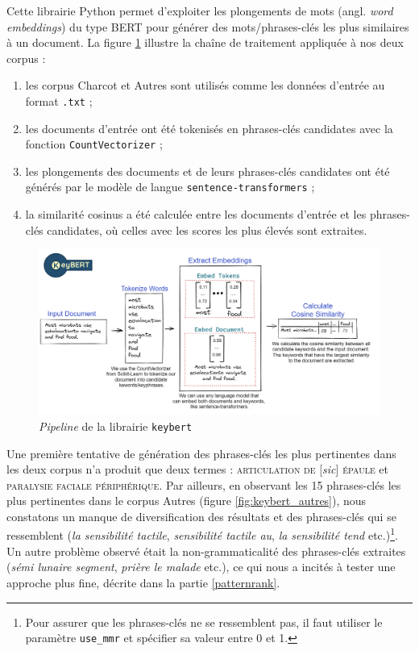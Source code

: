 Cette librairie Python permet d'exploiter les plongements de mots (angl. \textit{word embeddings}) du type \textsc{BERT} pour générer des mots/phrases-clés les plus similaires à un document.
La figure \ref{fig:keybert} illustre la chaîne de traitement appliquée à nos deux corpus : 
\begin{enumerate}
\item les corpus \og Charcot \fg{} et \og Autres \fg{} sont utilisés comme les données d'entrée au format \texttt{.txt} ;
\item les documents d'entrée ont été tokenisés en phrases-clés candidates avec la fonction \texttt{CountVectorizer} ; 
\item les plongements des documents et de leurs phrases-clés candidates ont été générés par le modèle de langue \texttt{sentence-transformers} ;
\item la similarité cosinus a été calculée entre les documents d'entrée et les phrases-clés candidates, où celles avec les scores les plus élevés sont extraites.
\end{enumerate}

\begin{figure}[!h]
    \centering
    \includegraphics[width=1\textwidth]{img/keybert.png}
    \caption[Caption for LOF]{\textit{Pipeline} de la librairie \texttt{keybert}\protect{}}
    \label{fig:keybert}
\end{figure}


Une première tentative de génération des phrases-clés les plus pertinentes dans les deux corpus n'a produit que deux termes : \textsc{articulation de} [\textit{sic}] \textsc{épaule} et \textsc{paralysie faciale périphérique}. Par ailleurs, en observant les 15 phrases-clés les plus pertinentes dans le corpus \og Autres \fg{} (figure \ref{fig:keybert_autres}), nous constatons un manque de diversification des résultats et des phrases-clés qui se ressemblent (\textit{la sensibilité tactile}, \textit{sensibilité tactile au}, \textit{la sensibilité tend} etc.)\footnote{Pour assurer que les phrases-clés ne se ressemblent pas, il faut utiliser le paramètre \texttt{use\_mmr} et spécifier sa valeur entre 0 et 1.}. Un autre problème observé était la non-grammaticalité des phrases-clés extraites (\textit{sémi lunaire segment}, \textit{prière le malade} etc.), ce qui nous a incités à tester une approche plus fine, décrite dans la partie \ref{patternrank}.

